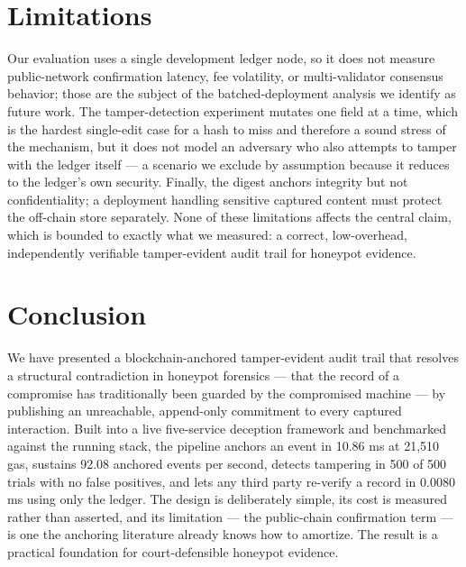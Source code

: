 \documentclass[conference]{IEEEtran}
\begin{document}
\section{Limitations}

Our evaluation uses a single development ledger node, so it does not measure public-network confirmation latency, fee volatility, or multi-validator consensus behavior; those are the subject of the batched-deployment analysis we identify as future work. The tamper-detection experiment mutates one field at a time, which is the hardest single-edit case for a hash to miss and therefore a sound stress of the mechanism, but it does not model an adversary who also attempts to tamper with the ledger itself --- a scenario we exclude by assumption because it reduces to the ledger's own security. Finally, the digest anchors integrity but not confidentiality; a deployment handling sensitive captured content must protect the off-chain store separately. None of these limitations affects the central claim, which is bounded to exactly what we measured: a correct, low-overhead, independently verifiable tamper-evident audit trail for honeypot evidence.

\section{Conclusion}

We have presented a blockchain-anchored tamper-evident audit trail that resolves a structural contradiction in honeypot forensics --- that the record of a compromise has traditionally been guarded by the compromised machine --- by publishing an unreachable, append-only commitment to every captured interaction. Built into a live five-service deception framework and benchmarked against the running stack, the pipeline anchors an event in 10.86 ms at 21,510 gas, sustains 92.08 anchored events per second, detects tampering in 500 of 500 trials with no false positives, and lets any third party re-verify a record in 0.0080 ms using only the ledger. The design is deliberately simple, its cost is measured rather than asserted, and its limitation --- the public-chain confirmation term --- is one the anchoring literature already knows how to amortize. The result is a practical foundation for court-defensible honeypot evidence.

\end{document}
